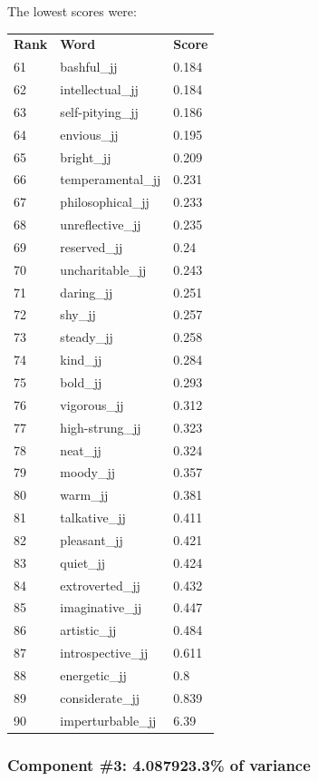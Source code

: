 \documentclass[10pt,letterpaper]{book}
\begin{document}
The lowest scores were:
\begin{tabular}{ l l l }
        \textbf{Rank} & \textbf{Word} & \textbf{Score} \\
        61 & bashful\_jj & 0.184 \\
        62 & intellectual\_jj & 0.184 \\
        63 & self-pitying\_jj & 0.186 \\
        64 & envious\_jj & 0.195 \\
        65 & bright\_jj & 0.209 \\
        66 & temperamental\_jj & 0.231 \\
        67 & philosophical\_jj & 0.233 \\
        68 & unreflective\_jj & 0.235 \\
        69 & reserved\_jj & 0.24 \\
        70 & uncharitable\_jj & 0.243 \\
        71 & daring\_jj & 0.251 \\
        72 & shy\_jj & 0.257 \\
        73 & steady\_jj & 0.258 \\
        74 & kind\_jj & 0.284 \\
        75 & bold\_jj & 0.293 \\
        76 & vigorous\_jj & 0.312 \\
        77 & high-strung\_jj & 0.323 \\
        78 & neat\_jj & 0.324 \\
        79 & moody\_jj & 0.357 \\
        80 & warm\_jj & 0.381 \\
        81 & talkative\_jj & 0.411 \\
        82 & pleasant\_jj & 0.421 \\
        83 & quiet\_jj & 0.424 \\
        84 & extroverted\_jj & 0.432 \\
        85 & imaginative\_jj & 0.447 \\
        86 & artistic\_jj & 0.484 \\
        87 & introspective\_jj & 0.611 \\
        88 & energetic\_jj & 0.8 \\
        89 & considerate\_jj & 0.839 \\
        90 & imperturbable\_jj & 6.39 \\
\end{tabular}
\subsubsection{Component \#3: 4.087923.3\% of variance}
\end{document}
